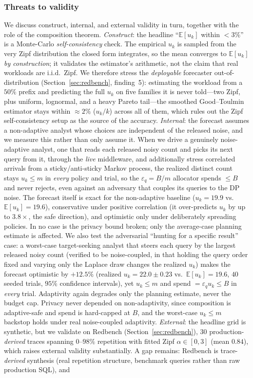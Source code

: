 \documentclass[sigconf,nonacm]{acmart}
\newcommand{\eps}{\varepsilon}
\newcommand{\E}{\mathbb{E}}
\begin{document}
\subsubsection*{Threats to validity}
We discuss construct, internal, and external validity in turn, together with the role of the composition theorem. \emph{Construct}: the headline ``$\E[u_k]$ within $<3\%$'' is a Monte-Carlo \emph{self-consistency} check. The empirical $u_k$ is sampled from the very Zipf distribution the closed form integrates, so the mean converges to $\E[u_k]$ \emph{by construction}; it validates the estimator's arithmetic, not the claim that real workloads are i.i.d.\ Zipf. We therefore stress the \emph{deployable} forecaster out-of-distribution (Section~\ref{sec:redbench}, finding~5): estimating the workload from a $50\%$ prefix and predicting the full $u_k$ on five families it is never told---two Zipf, plus uniform, lognormal, and a heavy Pareto tail---the smoothed Good--Toulmin estimator stays within $\approx2\%$ ($u_k/k$) across all of them, which rules out the Zipf self-consistency setup as the source of the accuracy. \emph{Internal}: the forecast assumes a non-adaptive analyst whose choices are independent of the released noise, and we measure this rather than only assume it. When we drive a genuinely noise-adaptive analyst, one that reads each released noisy count and picks its next query from it, through the \emph{live} middleware, and additionally stress correlated arrivals from a sticky/anti-sticky Markov process, the realized distinct count stays $u_k\le m$ in \emph{every} policy and trial, so the $\eps_q{=}B/m$ allocator spends $\le B$ and never rejects, even against an adversary that couples its queries to the DP noise. The forecast itself is exact for the non-adaptive baseline ($u_k{=}19.9$ vs.\ $\E[u_k]{=}19.6$), conservative under positive correlation (it over-predicts $u_k$ by up to $3.8\times$, the safe direction), and optimistic only under deliberately spreading policies. In no case is the privacy bound broken; only the average-case planning estimate is affected. We also test the adversarial ``hunting for a specific result'' case: a worst-case target-seeking analyst that steers each query by the largest released noisy count (verified to be noise-coupled, in that holding the query order fixed and varying only the Laplace draw changes the realized $u_k$) makes the forecast optimistic by $+12.5\%$ (realized $u_k{=}22.0{\pm}0.23$ vs.\ $\E[u_k]{=}19.6$, $40$ seeded trials, $95\%$ confidence intervals), yet $u_k\le m$ and spend $=\eps_q u_k\le B$ in \emph{every} trial. Adaptivity again degrades only the planning estimate, never the budget cap. Privacy never depended on non-adaptivity, since composition is adaptive-safe and spend is hard-capped at $B$, and the worst-case $u_k\le m$ backstop holds under real noise-coupled adaptivity. \emph{External}: the headline grid is synthetic, but we validate on Redbench (Section~\ref{sec:redbench}), 30 production-\emph{derived} traces spanning $0$--$98\%$ repetition with fitted Zipf $\alpha\in[0,3]$ (mean $0.84$), which raises external validity substantially. A gap remains: Redbench is trace-\emph{derived} synthesis (real repetition structure, benchmark queries rather than raw production SQL), and 
\end{document}
